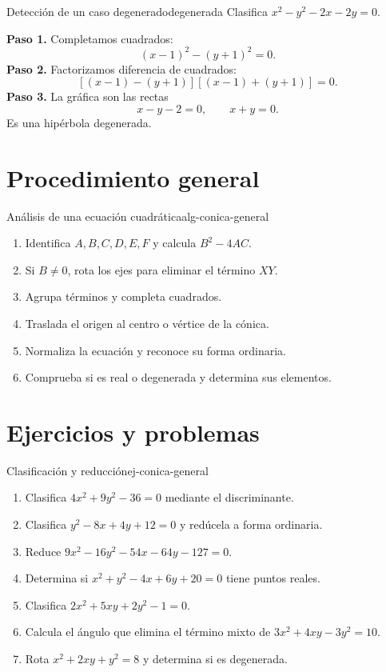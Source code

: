 \begin{example}{Detección de un caso degenerado}{degenerada}
Clasifica $x^2-y^2-2x-2y=0$.
\begin{solution}
\textbf{Paso 1.} Completamos cuadrados:
\[
(x-1)^2-(y+1)^2=0.
\]
\textbf{Paso 2.} Factorizamos diferencia de cuadrados:
\[
[(x-1)-(y+1)][(x-1)+(y+1)]=0.
\]
\textbf{Paso 3.} La gráfica son las rectas
\[
x-y-2=0,
\qquad
x+y=0.
\]
Es una hipérbola degenerada.
\end{solution}
\end{example}

\section{Procedimiento general}

\begin{algorithm}{Análisis de una ecuación cuadrática}{alg-conica-general}
\begin{enumerate}
  \item Identifica $A,B,C,D,E,F$ y calcula $B^2-4AC$.
  \item Si $B\neq0$, rota los ejes para eliminar el término $XY$.
  \item Agrupa términos y completa cuadrados.
  \item Traslada el origen al centro o vértice de la cónica.
  \item Normaliza la ecuación y reconoce su forma ordinaria.
  \item Comprueba si es real o degenerada y determina sus elementos.
\end{enumerate}
\end{algorithm}

\section{Ejercicios y problemas}

\begin{exercise}{Clasificación y reducción}{ej-conica-general}
\begin{enumerate}
  \item Clasifica $4x^2+9y^2-36=0$ mediante el discriminante.
  \item Clasifica $y^2-8x+4y+12=0$ y redúcela a forma ordinaria.
  \item Reduce $9x^2-16y^2-54x-64y-127=0$.
  \item Determina si $x^2+y^2-4x+6y+20=0$ tiene puntos reales.
  \item Clasifica $2x^2+5xy+2y^2-1=0$.
  \item Calcula el ángulo que elimina el término mixto de
  $3x^2+4xy-3y^2=10$.
  \item Rota $x^2+2xy+y^2=8$ y determina si es degenerada.
\end{enumerate}
\end{exercise}

